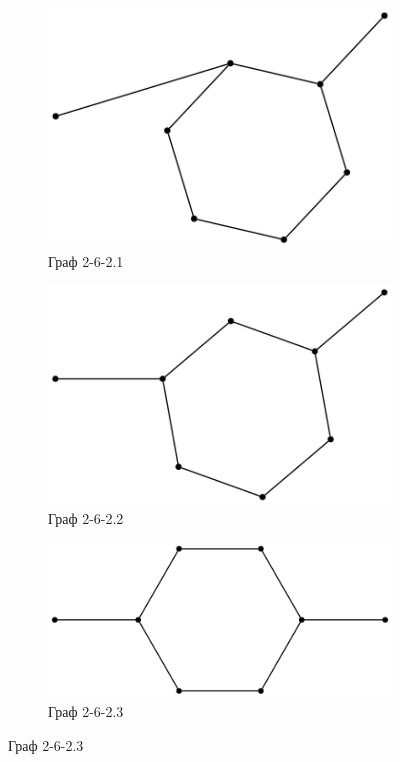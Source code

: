 \begin{solution}
\begin{figure}[H]
    \centering
    \begin{subfigure}[b]{0.45\linewidth}
        \centering
        \includegraphics[scale=0.4]{Fall/img/solution-441_262_1.dot.png}
        \caption{Граф 2-6-2.1} \label{graph 2-6-2.1}
    \end{subfigure}
    \begin{subfigure}[b]{0.45\linewidth}
        \centering
        \includegraphics[scale=0.4]{Fall/img/solution-441_262_2.dot.png}
        \caption{Граф 2-6-2.2} \label{graph 2-6-2.2}
    \end{subfigure}
    \begin{subfigure}[b]{0.45\linewidth} 
        \centering
        \includegraphics[scale=0.4]{Fall/img/solution-441_262_3.dot.png}
        \caption{Граф 2-6-2.3} \label{graph 2-6-2.3}

\end{subfigure}
\end{figure}
\end{solution}
